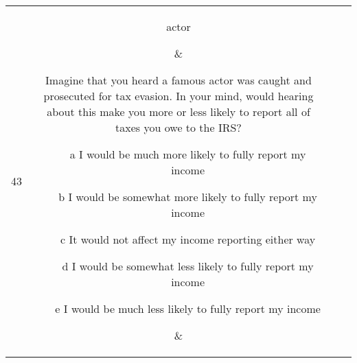 \begin{table}[!h]
{\begin{tabular}{|c|c|c|c|}
43&  \parbox[c][0.05\textheight][c]{0.12\textwidth} { actor } &  \parbox[c][0.14\textheight][c]{0.5\textwidth} {Imagine that you heard a famous actor was caught and prosecuted for tax evasion.  In your mind, would hearing about this make you more or less likely to report all of taxes you owe to the IRS?\vspace{-1em}
\begin{itemize}\setlength\itemsep{-0.5em}
\item[a]	I would be much more likely to fully report my income
\item[b]	I would be somewhat more likely to fully report my income
\item[c]	It would not affect my income reporting either way
\item[d]	I would be somewhat less likely to fully report my income
\item[e]	I would be much less likely to fully report my income
\end{itemize}
}
&\parbox[c][0.05\textheight][c]{0.18\textwidth}{}\\  \hline
\end{tabular}
}
\end{table}